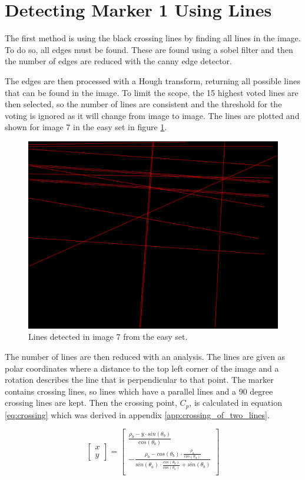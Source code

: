 \section{Detecting Marker 1 Using Lines}\label{sec:using_lines}
The first method is using the black crossing lines by finding all lines in the image.
To do so, all edges must be found.
These are found using a sobel filter and then the number of edges are reduced with the canny edge detector.

The edges are then processed with a Hough transform, returning all possible lines that can be found in the image.
To limit the scope, the 15 highest voted lines are then selected, so the number of lines are consistent and the threshold for the voting is ignored as it will change from image to image.
The lines are plotted and shown for image 7 in the easy set in figure \ref{fig:lines_in_image}.


\begin{figure}[H]
 \centering
 \includegraphics[width=0.6\linewidth]{graphics/Lines_in_image}
 \caption{Lines detected in image 7 from the easy set.}
 \label{fig:lines_in_image}
\end{figure}

The number of lines are then reduced with an analysis.
The lines are given as polar coordinates where a distance to the top left corner of the image and a rotation describes the line that is perpendicular to that point.
The marker contains crossing lines, so lines which have a parallel lines and a 90 degree crossing lines are kept.
Then the crossing point, $C_p$, is calculated in equation \ref{eq:crossing} which was derived in appendix \ref{app:crossing_of_two_lines}.

\def\arraystretch{2}
\begin{equation}
\left[
\begin{array}{c}
 x\\y
\end{array}
\right]
=
\left[
\begin{array}{c}
  \frac{ \rho_b - y \cdot  sin(\theta_b) }{ cos(\theta_b) }
  \\
  - \frac{\rho_b - cos(\theta_b) \cdot \frac{\rho_a}{cos(\theta_a)} }{ sin(\theta_a) \cdot \frac{ cos(\theta_b) }{ cos(\theta_a) } + sin(\theta_b) }
  \\
\end{array}
\right]
 \label{eq:crossing}
\end{equation}
\def\arraystretch{\customarrayHeight}

